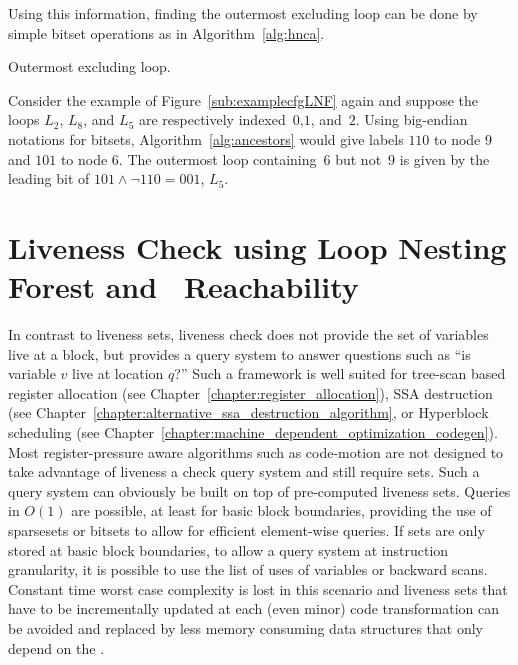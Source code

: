 Using this information, finding the outermost excluding loop can be done by simple bitset operations as in Algorithm~\ref{alg:hnca}.

\begin{algorithm}
\caption{Outermost excluding loop.}
\label{alg:hnca}
\end{algorithm}

\begin{example}
	Consider the example of Figure~\ref{sub:examplecfgLNF} again and suppose the loops $L_2$, $L_8$, and $L_5$ are respectively indexed~$0$,$1$, and~$2$.
	Using big-endian notations for bitsets, Algorithm~\ref{alg:ancestors} would give labels $110$ to node $9$ and $101$ to node $6$.
	The outermost loop containing~$6$ but not~$9$ is given by the leading bit of $101\wedge \lnot 110=001$, \ie $L_5$.
\end{example}



\section{Liveness Check using Loop Nesting Forest and \Reduced\ Reachability}
\label{sec:live-check}


In contrast to liveness sets, liveness check does not provide the set of variables live at a block, but provides a query system to answer questions such as ``is variable $v$ live at location $q$?''
Such a framework is well suited for tree-scan based register allocation (see Chapter~\ref{chapter:register_allocation}), SSA destruction (see Chapter~\ref{chapter:alternative_ssa_destruction_algorithm}, or Hyperblock scheduling (see Chapter~\ref{chapter:machine_dependent_optimization_codegen}).
Most register-pressure aware algorithms such as code-motion are not designed to take advantage of liveness a check query system and still require sets.
Such a query system can obviously be built on top of pre-computed liveness sets.
Queries in $O(1)$ are possible, at least for basic block boundaries, providing the use of sparsesets or bitsets to allow for efficient element-wise queries.
If sets are only stored at basic block boundaries, to allow a query system at instruction granularity, it is possible to use the list of uses of variables or backward scans.
Constant time worst case complexity is lost in this scenario and liveness sets that have to be incrementally updated at each (even minor) code transformation can be avoided and replaced by less memory consuming data structures that only depend on the \@CFG.

